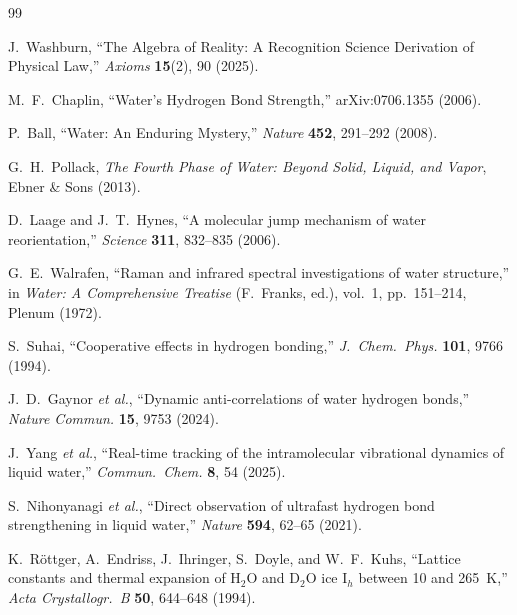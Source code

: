 \documentclass[12pt,a4paper]{article}
\theoremstyle{definition}
\theoremstyle{remark}
\begin{document}
\begin{thebibliography}{99}

J.~Washburn, ``The Algebra of Reality: A Recognition Science Derivation
of Physical Law,'' \textit{Axioms} \textbf{15}(2), 90 (2025).

M.~F.~Chaplin, ``Water's Hydrogen Bond Strength,''
arXiv:0706.1355 (2006).

P.~Ball, ``Water: An Enduring Mystery,''
\textit{Nature} \textbf{452}, 291--292 (2008).

G.~H.~Pollack, \textit{The Fourth Phase of Water: Beyond Solid,
Liquid, and Vapor}, Ebner \& Sons (2013).

D.~Laage and J.~T.~Hynes, ``A molecular jump mechanism of water
reorientation,'' \textit{Science} \textbf{311}, 832--835 (2006).

G.~E.~Walrafen, ``Raman and infrared spectral investigations of water
structure,'' in \textit{Water: A Comprehensive Treatise} (F.~Franks,
ed.), vol.~1, pp.~151--214, Plenum (1972).

S.~Suhai, ``Cooperative effects in hydrogen bonding,''
\textit{J.~Chem.~Phys.} \textbf{101}, 9766 (1994).

J.~D.~Gaynor \textit{et al.}, ``Dynamic anti-correlations of water
hydrogen bonds,'' \textit{Nature Commun.} \textbf{15}, 9753 (2024).

J.~Yang \textit{et al.}, ``Real-time tracking of the intramolecular
vibrational dynamics of liquid water,''
\textit{Commun.\ Chem.} \textbf{8}, 54 (2025).

S.~Nihonyanagi \textit{et al.}, ``Direct observation of ultrafast
hydrogen bond strengthening in liquid water,''
\textit{Nature} \textbf{594}, 62--65 (2021).

K.~R\"ottger, A.~Endriss, J.~Ihringer, S.~Doyle, and W.~F.~Kuhs,
``Lattice constants and thermal expansion of H$_2$O and D$_2$O ice
I$_h$ between 10 and 265~K,''
\textit{Acta Crystallogr.~B} \textbf{50}, 644--648 (1994).


\end{thebibliography}
\end{document}
